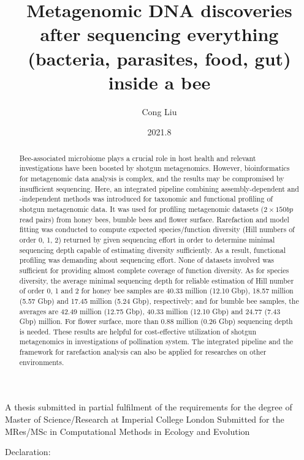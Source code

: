 \documentclass[11pt]{article}
\title{Metagenomic DNA discoveries after sequencing everything (bacteria, parasites, food, gut) inside a bee}
\author{Cong Liu}
\date{2021.8}
\begin{document}


  \maketitle
  \vspace*{\fill}
  \begin{center}
    A thesis submitted in partial fulfilment of the requirements for the degree of Master
of Science/Research at Imperial College London
\newline
Submitted for the MRes/MSc in Computational Methods in Ecology and Evolution
  \end{center}

  \newpage
  Declaration:
  \newline

  \newpage
  \linenumbers
  \begin{abstract}
    Bee-associated microbiome plays a crucial role in host health and relevant investigations have been boosted by shotgun metagenomics. 
    However, bioinformatics for metagenomic data analysis is complex, and the results may be compromised by insufficient sequencing. 
    Here, an integrated pipeline combining assembly-dependent and -independent methods was introduced for taxonomic and functional profiling of shotgun metagenomic data. 
    It was used for profiling metagenomic datasets ($2 \times 150 bp$ read pairs) from honey bees, bumble bees and flower surface. 
    Rarefaction and model fitting was conducted to compute expected species/function diversity (Hill numbers of order 0, 1, 2) returned by given sequencing effort in order to determine minimal sequencing depth capable of estimating diversity sufficiently. 
    As a result, functional profiling was demanding about sequencing effort. 
    None of datasets involved was sufficient for providing almost complete coverage of function diversity. 
    As for species diversity, the average minimal sequencing depth for reliable estimation of Hill number of order 0, 1 and 2 for honey bee samples are 40.33 million (12.10 Gbp), 18.57 million (5.57 Gbp) and 17.45 million (5.24 Gbp), respectively; and for bumble bee samples, the averages are 42.49 million (12.75 Gbp), 40.33 million (12.10 Gbp) and 24.77 (7.43 Gbp) million. 
    For flower surface, more than 0.88 million (0.26 Gbp) sequencing depth is needed. 
    These results are helpful for cost-effective utilization of shotgun metagenomics in investigations of pollination system. 
    The integrated pipeline and the framework for rarefaction analysis can also be applied for researches on other environments. 
  \end{abstract}
\end{document}
